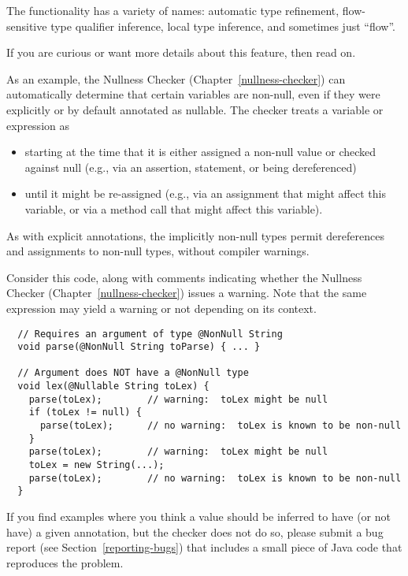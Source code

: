 The functionality has a variety of names:  automatic type refinement,
flow-sensitive type qualifier inference, local type inference, and
sometimes just ``flow''.

If you are curious or want more details about this feature, then read on.

As an example, the Nullness Checker (Chapter~\ref{nullness-checker}) can automatically
determine that certain variables are non-null, even if they were explicitly
or by default annotated as nullable.
The checker treats a variable or expression as 
\begin{itemize}
\item
starting at the time that it is either
assigned a non-null value or checked against null (e.g., via an assertion,
 statement, or being dereferenced)
\item
until it might be re-assigned (e.g.,
via an assignment that might affect this variable, or via a method call
that might affect this variable).
\end{itemize}

As with explicit annotations, the implicitly non-null types permit
dereferences and assignments to non-null types, without
compiler warnings.

Consider this code, along with comments indicating whether the
Nullness Checker (Chapter~\ref{nullness-checker}) issues a warning.  Note that the same expression may yield a
warning or not depending on its context.

\begin{Verbatim}
  // Requires an argument of type @NonNull String
  void parse(@NonNull String toParse) { ... }

  // Argument does NOT have a @NonNull type
  void lex(@Nullable String toLex) {
    parse(toLex);        // warning:  toLex might be null
    if (toLex != null) {
      parse(toLex);      // no warning:  toLex is known to be non-null
    }
    parse(toLex);        // warning:  toLex might be null
    toLex = new String(...);
    parse(toLex);        // no warning:  toLex is known to be non-null
  }
\end{Verbatim}

If you find examples where you think a value should be inferred to have
(or not have) a
given annotation, but the checker does not do so, please submit a bug
report (see Section~\ref{reporting-bugs}) that includes a small piece of
Java code that reproduces the problem.

